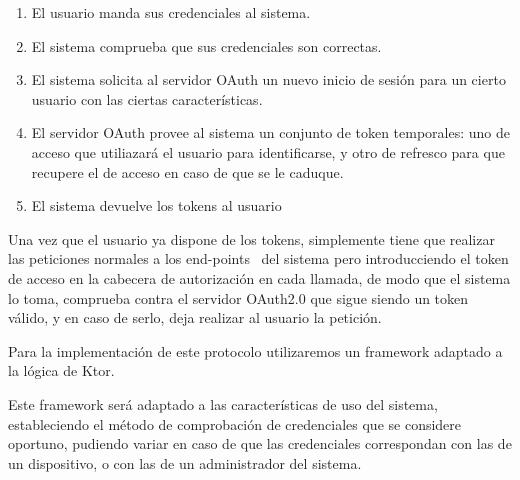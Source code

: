 \begin{enumerate}
        \item El usuario manda sus credenciales al sistema.
        \item El sistema comprueba que sus credenciales son correctas.
        \item El sistema solicita al servidor OAuth un nuevo inicio de sesión para un cierto usuario con las ciertas características.
        \item El servidor OAuth provee al sistema un conjunto de token temporales: uno de acceso que utiliazará el usuario para identificarse, y otro de refresco para que recupere el de acceso en caso de que se le caduque.
        \item El sistema devuelve los tokens al usuario
\end{enumerate}
Una vez que el usuario ya dispone de los tokens, simplemente tiene que realizar las peticiones normales a los end-points~\cite{endpoint} del sistema pero introducciendo el token de acceso en la cabecera de autorización en cada llamada, de modo que el sistema lo toma, comprueba contra el servidor OAuth2.0 que sigue siendo un token válido, y en caso de serlo, deja realizar al usuario la petición.

Para la implementación de este protocolo utilizaremos un framework adaptado a la lógica de Ktor.~\cite{myndocs.oauth2}

Este framework será adaptado a las características de uso del sistema, estableciendo el método de comprobación de credenciales que se considere oportuno, pudiendo variar en caso de que las credenciales correspondan con las de un dispositivo, o con las de un administrador del sistema.

